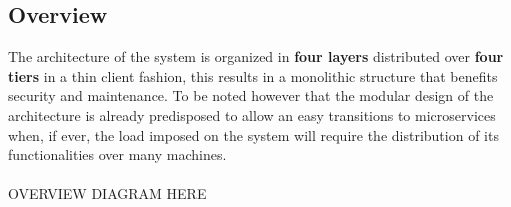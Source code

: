 \documentclass[11pt]{article}
\begin{document}





\subsection{Overview}

The architecture of the system is organized in \textbf{four layers} distributed over \textbf{four tiers} in a thin client fashion, this results in a monolithic structure that benefits security and maintenance. To be noted however that the modular design of the architecture is already predisposed to allow an easy transitions to microservices when, if ever, the load imposed on the system will require the distribution of its functionalities over many machines. \\
\\
OVERVIEW DIAGRAM HERE
\end{document}
